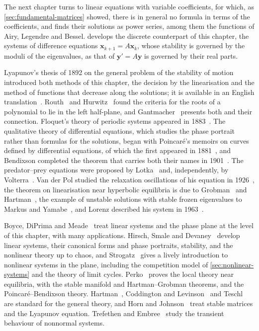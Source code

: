The next chapter turns to linear equations with variable coefficients, for which, as \cref{sec:fundamental-matrices} showed, there is in general no formula in terms of the coefficients, and finds their solutions as power series, among them the functions of Airy, Legendre and Bessel.  develops the discrete counterpart of this chapter, the systems of difference equations $\mathbf x_{k+1}=A\mathbf x_k$, whose stability is governed by the moduli of the eigenvalues, as that of $\mathbf y'=A\mathbf y$ is governed by their real parts.

\chapternotes

Lyapunov's thesis of 1892 on the general problem of the stability of motion introduced both methods of this chapter, the decision by the linearisation and the method of functions that decrease along the solutions; it is available in an English translation~\cite{lyapunov1992}. Routh~\cite{routh1877} and Hurwitz~\cite{hurwitz1895} found the criteria for the roots of a polynomial to lie in the left half-plane, and Gantmacher~\cite[Chap.~XV]{gantmacher1959vol2} presents both and their connection. Floquet's theory of periodic systems appeared in 1883~\cite{floquet1883}. The qualitative theory of differential equations, which studies the phase portrait rather than formulas for the solutions, began with Poincar\'e's memoirs on curves defined by differential equations, of which the first appeared in 1881~\cite{poincare1881}, and Bendixson completed the theorem that carries both their names in 1901~\cite{bendixson1901}. The predator--prey equations were proposed by Lotka~\cite{lotka1925} and, independently, by Volterra~\cite{volterra1926}. Van der Pol studied the relaxation oscillations of his equation in 1926~\cite{vanderpol1926}, the theorem on linearisation near hyperbolic equilibria is due to Grobman~\cite{grobman1959} and Hartman~\cite{hartman1960}, the example of unstable solutions with stable frozen eigenvalues to Markus and Yamabe~\cite{markus1960}, and Lorenz described his system in 1963~\cite{lorenz1963}.

Boyce, DiPrima and Meade~\cite[Chaps.~7 and~9]{boyce2017} treat linear systems and the phase plane at the level of this chapter, with many applications. Hirsch, Smale and Devaney~\cite{hirsch2013} develop linear systems, their canonical forms and phase portraits, stability, and the nonlinear theory up to chaos, and Strogatz~\cite{strogatz2015} gives a lively introduction to nonlinear systems in the plane, including the competition model of \cref{sec:nonlinear-systems} and the theory of limit cycles. Perko~\cite{perko2001} proves the local theory near equilibria, with the stable manifold and Hartman--Grobman theorems, and the Poincar\'e--Bendixson theory. Hartman~\cite{hartman2002}, Coddington and Levinson~\cite{coddington1955} and Teschl~\cite{teschl2012} are standard for the general theory, and Horn and Johnson~\cite[Chap.~2]{horn1991topics} treat stable matrices and the Lyapunov equation. Trefethen and Embree~\cite{trefethen2005} study the transient behaviour of nonnormal systems.

\chapterreferences
